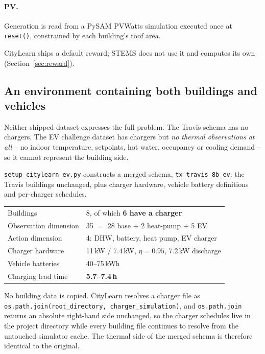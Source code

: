 \documentclass[11pt]{article}
\begin{document}
\paragraph{PV.} Generation is read from a PySAM PVWatts simulation executed once
at \texttt{reset()}, constrained by each building's roof area.

CityLearn ships a default reward; STEMS does not use it and computes its own
(Section~\ref{sec:reward}).

\subsection{An environment containing both buildings and vehicles}
\label{sec:merged-schema}

Neither shipped dataset expresses the full problem. The Travis schema has no
chargers. The EV challenge dataset has chargers but \emph{no thermal
observations at all} -- no indoor temperature, setpoints, hot water, occupancy or
cooling demand -- so it cannot represent the building side.

\texttt{setup\_citylearn\_ev.py} constructs a merged schema,
\texttt{tx\_travis\_8b\_ev}: the Travis buildings unchanged, plus charger
hardware, vehicle battery definitions and per-charger schedules.

\begin{center}
\begin{tabular}{ll}
\toprule
Buildings & 8, of which \textbf{6 have a charger} \\
Observation dimension & 35 $=$ 28 base $+$ 2 heat-pump $+$ 5 EV \\
Action dimension & 4: DHW, battery, heat pump, EV charger \\
Charger hardware & 11\,kW / 7.4\,kW, $\eta = 0.95$, 7.2\,kW discharge \\
Vehicle batteries & 40--75\,kWh \\
Charging lead time & \textbf{5.7--7.4\,h} \\
\bottomrule
\end{tabular}
\end{center}

No building data is copied. CityLearn resolves a charger file as
\texttt{os.path.join(root\_directory, charger\_simulation)}, and
\texttt{os.path.join} returns an absolute right-hand side unchanged, so the
charger schedules live in the project directory while every building file
continues to resolve from the untouched simulator cache. The thermal side of the
merged schema is therefore identical to the original.
\end{document}
